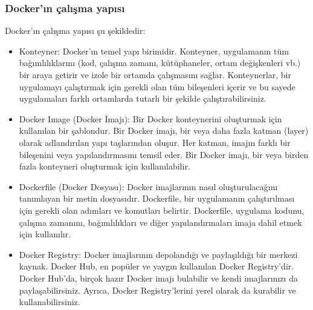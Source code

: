 \subsubsection{Docker'ın çalışma yapısı }
Docker'ın çalışma yapısı şu şekildedir:
\begin{itemize}
\item Konteyner: Docker'ın temel yapı birimidir. Konteyner, uygulamanın tüm bağımlılıklarını (kod, çalışma zamanı, kütüphaneler, ortam değişkenleri vb.) bir araya getirir ve izole bir ortamda çalışmasını sağlar. Konteynerlar, bir uygulamayı çalıştırmak için gerekli olan tüm bileşenleri içerir ve bu sayede uygulamaları farklı ortamlarda tutarlı bir şekilde çalıştırabilirsiniz.

\item Docker Image (Docker İmajı): Bir Docker konteynerini oluşturmak için kullanılan bir şablondur. Bir Docker imajı, bir veya daha fazla katman (layer) olarak adlandırılan yapı taşlarından oluşur. Her katman, imajın farklı bir bileşenini veya yapılandırmasını temsil eder. Bir Docker imajı, bir veya birden fazla konteyneri oluşturmak için kullanılabilir.

\item Dockerfile (Docker Dosyası): Docker imajlarının nasıl oluşturulacağını tanımlayan bir metin dosyasıdır. Dockerfile, bir uygulamanın çalıştırılması için gerekli olan adımları ve komutları belirtir. Dockerfile, uygulama kodunu, çalışma zamanını, bağımlılıkları ve diğer yapılandırmaları imaja dahil etmek için kullanılır.

\item Docker Registry: Docker imajlarının depolandığı ve paylaşıldığı bir merkezi kaynak. Docker Hub, en popüler ve yaygın kullanılan Docker Registry'dir. Docker Hub'da, birçok hazır Docker imajı bulabilir ve kendi imajlarınızı da paylaşabilirsiniz. Ayrıca, Docker Registry'lerini yerel olarak da kurabilir ve kullanabilirsiniz.
\end{itemize}


